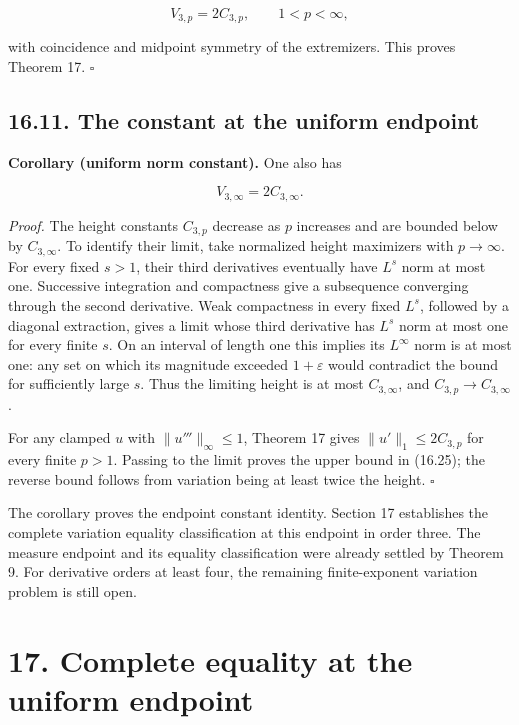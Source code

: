 \documentclass[11pt]{article}
\begin{document}
\[
V_{3,p}=2C_{3,p},\qquad 1<p<\infty,
\]

with coincidence and midpoint symmetry of the extremizers. This proves
Theorem 17. \(\square\)

\subsection{16.11. The constant at the uniform
endpoint}\label{the-constant-at-the-uniform-endpoint}

\textbf{Corollary (uniform norm constant).} One also has

\[
V_{3,\infty}=2C_{3,\infty}.
\tag{16.25}
\]

\emph{Proof.} The height constants \(C_{3,p}\) decrease as \(p\)
increases and are bounded below by \(C_{3,\infty}\). To identify their
limit, take normalized height maximizers with \(p\to\infty\). For every
fixed \(s>1\), their third derivatives eventually have \(L^s\) norm at
most one. Successive integration and compactness give a subsequence
converging through the second derivative. Weak compactness in every
fixed \(L^s\), followed by a diagonal extraction, gives a limit whose
third derivative has \(L^s\) norm at most one for every finite \(s\). On
an interval of length one this implies its \(L^\infty\) norm is at most
one: any set on which its magnitude exceeded \(1+\varepsilon\) would
contradict the bound for sufficiently large \(s\). Thus the limiting
height is at most \(C_{3,\infty}\), and \(C_{3,p}\to C_{3,\infty}\).

For any clamped \(u\) with \(\|u'''\|_\infty\le1\), Theorem 17 gives
\(\|u'\|_1\le2C_{3,p}\) for every finite \(p>1\). Passing to the limit
proves the upper bound in (16.25); the reverse bound follows from
variation being at least twice the height. \(\square\)

The corollary proves the endpoint constant identity. Section 17
establishes the complete variation equality classification at this
endpoint in order three. The measure endpoint and its equality
classification were already settled by Theorem 9. For derivative orders
at least four, the remaining finite-exponent variation problem is still
open.

\section{17. Complete equality at the uniform
endpoint}\label{complete-equality-at-the-uniform-endpoint}
\end{document}
